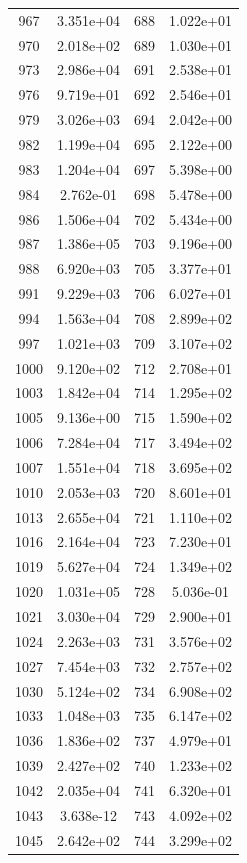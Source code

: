 \documentclass[12pt]{article}
\begin{document}
\begin{longtable}{@{}cccc@{}}
967 & 3.351e+04 & 688 & 1.022e+01 \\
970 & 2.018e+02 & 689 & 1.030e+01 \\
973 & 2.986e+04 & 691 & 2.538e+01 \\
976 & 9.719e+01 & 692 & 2.546e+01 \\
979 & 3.026e+03 & 694 & 2.042e+00 \\
982 & 1.199e+04 & 695 & 2.122e+00 \\
983 & 1.204e+04 & 697 & 5.398e+00 \\
984 & 2.762e-01 & 698 & 5.478e+00 \\
986 & 1.506e+04 & 702 & 5.434e+00 \\
987 & 1.386e+05 & 703 & 9.196e+00 \\
988 & 6.920e+03 & 705 & 3.377e+01 \\
991 & 9.229e+03 & 706 & 6.027e+01 \\
994 & 1.563e+04 & 708 & 2.899e+02 \\
997 & 1.021e+03 & 709 & 3.107e+02 \\
1000 & 9.120e+02 & 712 & 2.708e+01 \\
1003 & 1.842e+04 & 714 & 1.295e+02 \\
1005 & 9.136e+00 & 715 & 1.590e+02 \\
1006 & 7.284e+04 & 717 & 3.494e+02 \\
1007 & 1.551e+04 & 718 & 3.695e+02 \\
1010 & 2.053e+03 & 720 & 8.601e+01 \\
1013 & 2.655e+04 & 721 & 1.110e+02 \\
1016 & 2.164e+04 & 723 & 7.230e+01 \\
1019 & 5.627e+04 & 724 & 1.349e+02 \\
1020 & 1.031e+05 & 728 & 5.036e-01 \\
1021 & 3.030e+04 & 729 & 2.900e+01 \\
1024 & 2.263e+03 & 731 & 3.576e+02 \\
1027 & 7.454e+03 & 732 & 2.757e+02 \\
1030 & 5.124e+02 & 734 & 6.908e+02 \\
1033 & 1.048e+03 & 735 & 6.147e+02 \\
1036 & 1.836e+02 & 737 & 4.979e+01 \\
1039 & 2.427e+02 & 740 & 1.233e+02 \\
1042 & 2.035e+04 & 741 & 6.320e+01 \\
1043 & 3.638e-12 & 743 & 4.092e+02 \\
1045 & 2.642e+02 & 744 & 3.299e+02 \\

\end{longtable}
\end{document}
